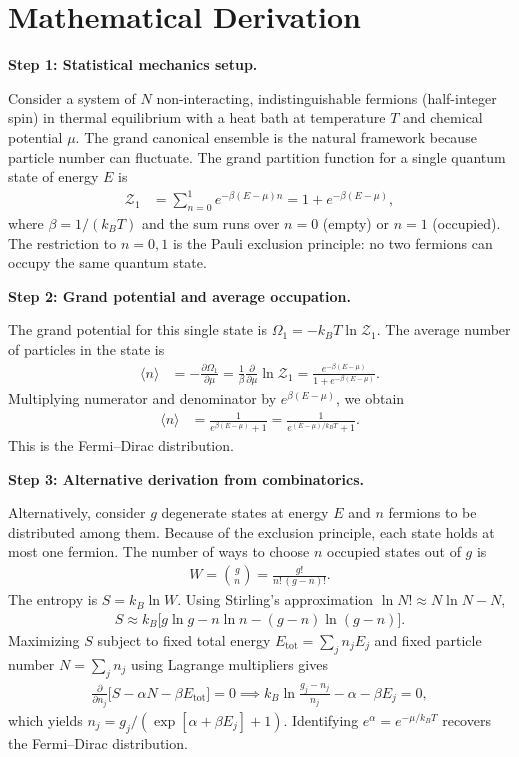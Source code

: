 \section*{Mathematical Derivation}

\textbf{Step 1: Statistical mechanics setup.}

Consider a system of $N$ non-interacting, indistinguishable fermions (half-integer spin) in thermal equilibrium with a heat bath at temperature $T$ and chemical potential $\mu$. The grand canonical ensemble is the natural framework because particle number can fluctuate. The grand partition function for a single quantum state of energy $E$ is
\begin{align}
\mathcal{Z}_1 &= \sum_{n=0}^{1} e^{-\beta(E - \mu)n} = 1 + e^{-\beta(E-\mu)},
\end{align}
where $\beta = 1/(k_B T)$ and the sum runs over $n = 0$ (empty) or $n = 1$ (occupied). The restriction to $n = 0, 1$ is the Pauli exclusion principle: no two fermions can occupy the same quantum state.

\textbf{Step 2: Grand potential and average occupation.}

The grand potential for this single state is $\Omega_1 = -k_B T \ln \mathcal{Z}_1$. The average number of particles in the state is
\begin{align}
\langle n \rangle &= -\frac{\partial \Omega_1}{\partial \mu} = \frac{1}{\beta}\frac{\partial}{\partial \mu}\ln\mathcal{Z}_1 = \frac{e^{-\beta(E-\mu)}}{1 + e^{-\beta(E-\mu)}}.
\end{align}
Multiplying numerator and denominator by $e^{\beta(E-\mu)}$, we obtain
\begin{align}
\langle n \rangle &= \frac{1}{e^{\beta(E-\mu)} + 1} = \frac{1}{e^{(E-\mu)/k_BT} + 1}.
\end{align}
This is the Fermi--Dirac distribution.

\textbf{Step 3: Alternative derivation from combinatorics.}

Alternatively, consider $g$ degenerate states at energy $E$ and $n$ fermions to be distributed among them. Because of the exclusion principle, each state holds at most one fermion. The number of ways to choose $n$ occupied states out of $g$ is
\begin{align}
W = \binom{g}{n} = \frac{g!}{n!\,(g-n)!}.
\end{align}
The entropy is $S = k_B \ln W$. Using Stirling's approximation $\ln N! \approx N\ln N - N$,
\begin{align}
S \approx k_B\bigl[g\ln g - n\ln n - (g-n)\ln(g-n)\bigr].
\end{align}
Maximizing $S$ subject to fixed total energy $E_{\text{tot}} = \sum_j n_j E_j$ and fixed particle number $N = \sum_j n_j$ using Lagrange multipliers gives
\begin{align}
\frac{\partial}{\partial n_j}\bigl[S - \alpha N - \beta E_{\text{tot}}\bigr] = 0 \implies k_B\ln\frac{g_j - n_j}{n_j} - \alpha - \beta E_j = 0,
\end{align}
which yields $n_j = g_j/(\exp[\alpha + \beta E_j] + 1)$. Identifying $e^\alpha = e^{-\mu/k_BT}$ recovers the Fermi--Dirac distribution.

